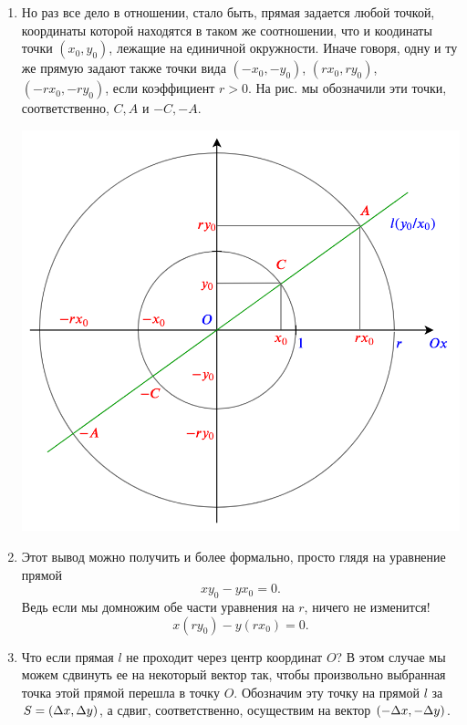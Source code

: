 \begin{enumerate}
\item Но раз все дело в отношении, стало быть, прямая задается любой точкой, координаты которой находятся в таком же соотношении, что и коодинаты точки $(x_0,y_0)$, лежащие на единичной окружности. Иначе говоря, одну и ту же прямую задают также точки вида $(-x_0,-y_0)$, $(rx_0,ry_0)$, $(-rx_0,-ry_0)$, если коэффициент $r>0$. На рис. мы обозначили эти точки, соответственно, $C,A$ и $-C,-A$.
\begin{center}
\includegraphics[scale=0.3]{line.png}
\end{center}
\item Этот вывод можно получить и более формально, просто глядя на уравнение прямой
$$
xy_0-yx_0=0.
$$
Ведь если мы домножим обе части уравнения на $r$, ничего не изменится!
$$
x(ry_0)-y(rx_0)=0.
$$
\item Что если прямая $l$ не проходит через центр координат $O$? В этом случае мы можем сдвинуть ее на некоторый вектор так, чтобы произвольно выбранная точка этой прямой перешла в точку $O$. Обозначим эту точку на прямой $l$ за $S=(\Delta x,\Delta y)$, а сдвиг, соответственно, осуществим на вектор $(-\Delta x,-\Delta y)$.
\begin{center}

\end{center}
\end{enumerate}
